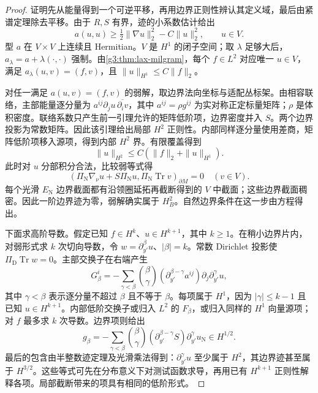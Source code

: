 \begin{proof}
	证明先从能量得到一个可逆平移，再用边界正则性辨认其定义域，最后由紧谱定理除去平移。由于 \(R,S\) 有界，迹的小系数估计给出
	\[
		a(u,u)\ge\tfrac12\|\nabla u\|_2^2-C\|u\|_2^2,
		\qquad u\in V.
	\]
	型 \(a\) 在 \(V\times V\) 上连续且 Hermitian。\(V\) 是 \(H^1\) 的闭子空间；取 \(\lambda\) 足够大后，\(a_\lambda=a+\lambda(\cdot,\cdot)\) 强制。由\cref{g3:thm:lax-milgram}，每个 \(f\in L^2\) 对应唯一 \(u\in V\)，满足
	\(a_\lambda(u,v)=(f,v)\)，且 \(\|u\|_{H^1}\le C\|f\|_2\)。

	对任一满足 \(a(u,v)=(f,v)\) 的弱解，取边界法向坐标与适配丛标架。由相容联络，主部能量逐分量为 \(a^{ij}\partial_j u\,\overline{\partial_i v}\)，其中 \(a^{ij}=\rho g^{ij}\) 为实对称正定标量矩阵；\(\rho\) 是体积密度。联络系数只产生前一引理允许的矩阵低阶项，边界密度并入 \(S\)。两个边界投影为常数矩阵。因此该引理给出局部 \(H^2\) 正则性。内部同样逐分量使用差商，矩阵低阶项移入源项，得到内部 \(H^2\) 界。有限覆盖得到
	\[
		\|u\|_{H^2}\le C(\|f\|_2+\|u\|_{H^1}).
	\]
	此时对 \(u\) 分部积分合法，比较弱等式得
	\[
		(\Pi_{\mathrm N}\nabla_\nu u+S\Pi_{\mathrm N}u,
		\Pi_{\mathrm N}\operatorname{Tr}v)_{\partial M}=0
		\quad(v\in V).
	\]
	每个光滑 \(E_{\mathrm N}\) 边界截面都有沿领圈延拓再截断得到的 \(V\) 中截面；这些边界截面稠密。因此一阶边界迹为零，弱解确实属于 \(H_B^2\)。自然边界条件在这一步由方程得出。

	下面求高阶导数。假定已知 \(f\in H^k\)、\(u\in H^{k+1}\)，其中 \(k\ge1\)。在稍小边界片内，对弱形式求 \(k\) 次切向导数，令 \(w=\partial_{y'}^\beta u\)、\(|\beta|=k\)。常数 Dirichlet 投影使 \(\Pi_{\mathrm D}\operatorname{Tr}w=0\)。主部交换子在右端产生
	\[
		G_\beta^i=-\sum_{\gamma<\beta}\binom\beta\gamma
		(\partial_{y'}^{\beta-\gamma}a^{ij})
		\partial_j\partial_{y'}^\gamma u,
	\]
	其中 \(\gamma<\beta\) 表示逐分量不超过 \(\beta\) 且不等于 \(\beta\)。每项属于 \(H^1\)，因为 \(|\gamma|\le k-1\) 且已知 \(u\in H^{k+1}\)。内部低阶交换子或归入 \(L^2\) 的 \(F_\beta\)，或归入同样的 \(H^1\) 向量源项；对 \(f\) 最多求 \(k\) 次导数。边界项则给出
	\[
		g_\beta=-\sum_{\gamma<\beta}\binom\beta\gamma
		(\partial_{y'}^{\beta-\gamma}S)
		\partial_{y'}^\gamma u_{\mathrm N}\in H^{1/2}.
	\]
	最后的包含由半整数迹定理及光滑乘法得到：\(\partial_{y'}^\gamma u\) 至少属于 \(H^2\)，其边界迹甚至属于 \(H^{3/2}\)。这些等式可先在分布意义下对测试函数求导，再用已有 \(H^{k+1}\) 正则性解释各项。局部截断带来的项具有相同的低阶形式。


\end{proof}
